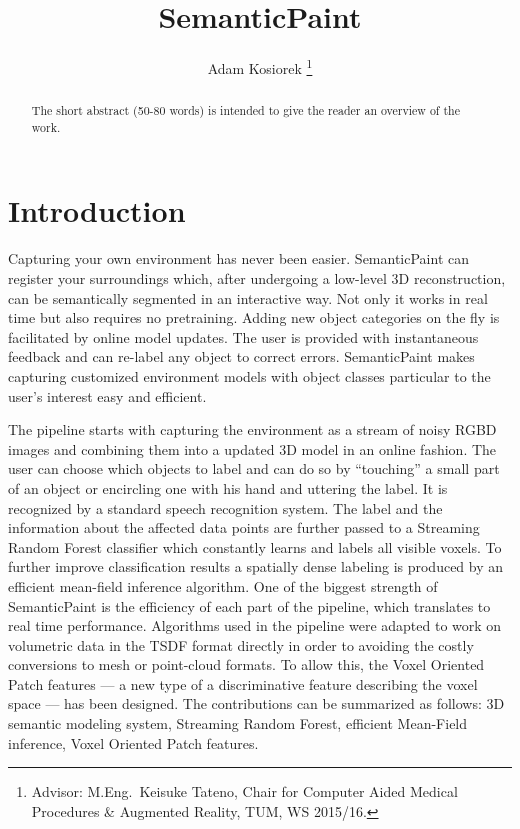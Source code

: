 \documentclass{llncs}
\begin{document}
	\title{SemanticPaint}
	\author{Adam Kosiorek
	\thanks{Advisor: M.Eng.~Keisuke Tateno, Chair for Computer Aided Medical Procedures \& Augmented Reality, TUM, WS 2015/16.}}
	\institute{}
	\maketitle

\begin{abstract}
	The short abstract (50-80 words) is intended to give the reader an overview of the work.
\end{abstract}

\section{Introduction}
  
  
  Capturing your own environment has never been easier. SemanticPaint can register your surroundings which, after undergoing a low-level 3D reconstruction, can be semantically segmented in an interactive way. Not only it works in real time but also requires no pretraining. Adding new object categories on the fly is facilitated by online model updates. The user is provided with instantaneous feedback and can re-label any object to correct errors. SemanticPaint makes capturing customized environment models with object classes particular to the user's interest easy and efficient.  
  
  The pipeline starts with capturing the environment as a stream of noisy RGBD images and combining them into a updated 3D model in an online fashion. The user can choose which objects to label and can do so by ``touching'' a small part of an object or encircling one with his hand and uttering the label. It is recognized by a standard speech recognition system. The label and the information about the affected data points are further passed to a Streaming Random Forest classifier which constantly learns and labels all visible voxels. To further improve classification results a spatially dense labeling is produced by an efficient mean-field inference algorithm. One of the biggest strength of SemanticPaint is the efficiency of each part of the pipeline, which translates to real time performance. Algorithms used in the pipeline were adapted to work on volumetric data in the TSDF format directly in order to avoiding the costly conversions to mesh or point-cloud formats. To allow this, the Voxel Oriented Patch features --- a new type of a discriminative feature describing the voxel space --- has been designed. 
  The contributions can be summarized as follows: 3D semantic modeling system, Streaming Random Forest, efficient Mean-Field inference, Voxel Oriented Patch features.
  
\end{document}
